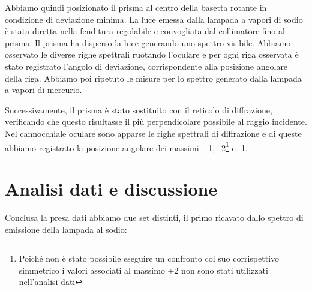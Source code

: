 \documentclass[9pt,a4paper,twocolumn,twoside]{tau-class/tau}
\begin{document}
Abbiamo quindi posizionato il prisma al centro della basetta rotante in condizione di deviazione minima. La luce emessa dalla lampada a vapori di sodio è stata diretta nella fenditura regolabile e convogliata dal collimatore fino al prisma. Il prisma ha disperso la luce generando uno spettro visibile. Abbiamo osservato le diverse righe spettrali ruotando l'oculare e per ogni riga osservata è stato registrato l'angolo di deviazione, corrispondente alla posizione angolare della riga. Abbiamo poi ripetuto le misure per lo spettro generato dalla lampada a vapori di mercurio.

Successivamente, il prisma è stato sostituito con il reticolo di diffrazione, verificando che questo risultasse il più perpendicolare possibile al raggio incidente. Nel cannocchiale oculare sono apparse le righe spettrali di diffrazione e di queste abbiamo registrato la posizione angolare dei massimi +1,+2\footnote{Poiché non è stato possibile eseguire un  confronto col suo corrispettivo simmetrico i valori associati al massimo +2 non sono stati utilizzati nell'analisi dati} e -1.


\section{Analisi dati e discussione}
Conclusa la presa dati abbiamo due set distinti, il primo ricavato dallo spettro di emissione della lampada al sodio:
\end{document}
